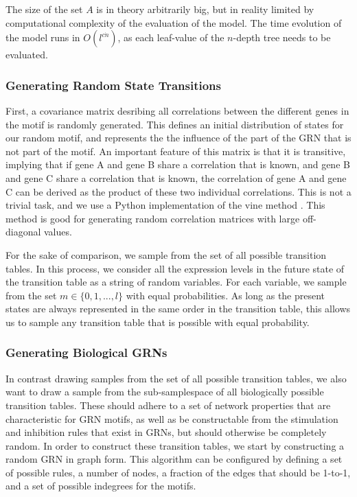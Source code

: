 \documentclass[../main.tex]{subfiles}
\begin{document}
The size of the set $A$ is in theory arbitrarily big, but in reality limited by computational complexity of the evaluation of the model. 
The time evolution of the model runs in $O(l^{c \dot n})$, as each leaf-value of the $n$-depth tree needs to be evaluated. 

\subsubsection{Generating Random State Transitions}

First, a covariance matrix desribing all correlations between the different genes in the motif is randomly generated.
This defines an initial distribution of states for our random motif, and represents the the influence of the part of the GRN that is not part of the motif.
An important feature of this matrix is that it is transitive, implying that if gene A and gene B share a correlation that is known, and gene B and gene C share a correlation that is known, the correlation of gene A and gene C can be derived as the product of these two individual correlations.
This is not a trivial task, and we use a Python implementation of the vine method \cite{lewandowski2009generating}.
This method is good for generating random correlation matrices with large off-diagonal values.

For the sake of comparison, we sample from the set of all possible transition tables.
In this process, we consider all the expression levels in the future state of the transition table as a string of random variables.
For each variable, we sample from the set $m \in \{0, 1, ..., l\}$ with equal probabilities.
As long as the present states are always represented in the same order in the transition table, this allows us to sample any transition table that is possible with equal probability.

\subsubsection{Generating Biological GRNs}

In contrast drawing samples from the set of all possible transition tables, we also want to draw a sample from the sub-samplespace of all biologically possible transition tables.
These should adhere to a set of network properties that are characteristic for GRN motifs, as well as be constructable from the stimulation and inhibition rules that exist in GRNs, but should otherwise be completely random.
In order to construct these transition tables, we start by constructing a random GRN in graph form.
This algorithm can be configured by defining a set of possible rules, a number of nodes, a fraction of the edges that should be 1-to-1, and a set of possible indegrees for the motifs.
\end{document}
